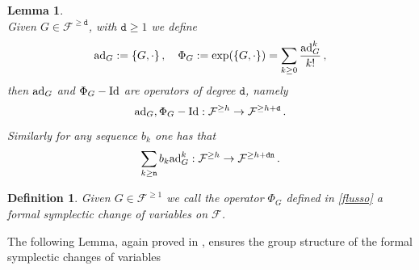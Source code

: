 \documentclass[reqno,11pt]{amsart}
\theoremstyle{plain}
\numberwithin{equation}{section}
\newtheorem{cor}[thm]{Corollary}
\newtheorem{lemma}[theorem]{Lemma}
\newtheorem{defn}[thm]{Definition}
\newcommand{\ad}{{\rm ad}}
\newcommand{\id}{{\rm Id}}
\renewcommand{\ge}{\geq}
\newcommand{\cF}{{\mathcal F}}
\newcommand{\td}{{\mathtt{d}}}
\newcommand{\tn}{{\mathtt{n}}}
\newcommand{\al}{{\alpha}}
\newcommand{\bt}{{\beta}}
\renewcommand{\ge}{\gtrsim}
\begin{document}
{\begin{lemma}
	\\
	Given $G\in \cF^{\geq  \td}$, with $\td\geq 1$  we define 
	\begin{equation}
		\label{flusso}
		\ad_G:= \{G,\cdot \} \,,\quad \Phi_G:=	\exp(\{G,\cdot\})= \sum_{k\geq 0} \frac{\ad_G^k}{k!}\,,
	\end{equation}
	then $ 	\ad_G$ and  $\Phi_G-\id$  are operators of degree $\td$, namely
	\[
	\ad_G,\Phi_G -\id: \cF^{\geq h} \to \cF^{\geq h+\td}\,.
	\]
	Similarly for any sequence $b_k$  one has that 
	\[
	\sum_{k\geq \tn } b_k{\ad_G^k}: \cF^{\geq h} \to \cF^{\geq h+\td\tn }\,.
	\] 
\end{lemma}
\begin{defn}
	Given $G\in \cF^{\geq 1}$ we call the operator $\Phi_G$ defined in \eqref{flusso} a formal symplectic change of variables on $\cF$.
\end{defn}
The following Lemma, again proved in \cite{ProcesiStolo}, ensures the group structure of the formal symplectic changes of variables
}
\end{document}
